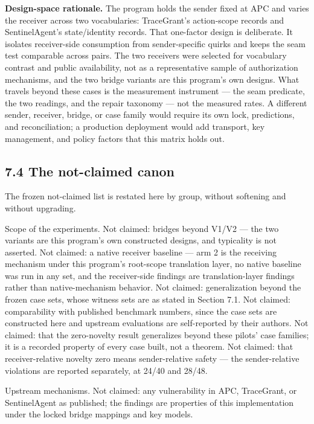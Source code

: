 \documentclass[
  10pt,
]{article}
\renewcommand{\_}{\allowbreak\origunderscore}
\begin{document}
\textbf{Design-space rationale.} The program holds the sender fixed at
APC and varies the receiver across two vocabularies: TraceGrant's
action-scope records and SentinelAgent's state/identity records. That
one-factor design is deliberate. It isolates receiver-side consumption
from sender-specific quirks and keeps the seam test comparable across
pairs. The two receivers were selected for vocabulary contrast and
public availability, not as a representative sample of authorization
mechanisms, and the two bridge variants are this program's own designs.
What travels beyond these cases is the measurement instrument --- the
seam predicate, the two readings, and the repair taxonomy --- not the
measured rates. A different sender, receiver, bridge, or case family
would require its own lock, predictions, and reconciliation; a
production deployment would add transport, key management, and policy
factors that this matrix holds out.

\subsection{7.4 The not-claimed canon}\label{the-not-claimed-canon}

The frozen not-claimed list is restated here by group, without softening
and without upgrading.

Scope of the experiments. Not claimed: bridges beyond V1/V2 --- the two
variants are this program's own constructed designs, and typicality is
not asserted. Not claimed: a native receiver baseline --- arm 2 is the
receiving mechanism under this program's root-scope translation layer,
no native baseline was run in any set, and the receiver-side findings
are translation-layer findings rather than native-mechanism behavior.
Not claimed: generalization beyond the frozen case sets, whose witness
sets are as stated in Section 7.1. Not claimed: comparability with
published benchmark numbers, since the case sets are constructed here
and upstream evaluations are self-reported by their authors. Not
claimed: that the zero-novelty result generalizes beyond these pilots'
case families; it is a recorded property of every case built, not a
theorem. Not claimed: that receiver-relative novelty zero means
sender-relative safety --- the sender-relative violations are reported
separately, at 24/40 and 28/48.

Upstream mechanisms. Not claimed: any vulnerability in APC, TraceGrant,
or SentinelAgent as published; the findings are properties of this
implementation under the locked bridge mappings and key models.
\end{document}
